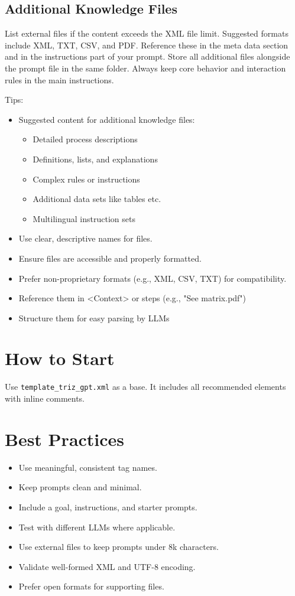 \documentclass[a4paper,11pt]{refart}
\begin{document}
\subsection{Additional Knowledge Files}
List external files if the content exceeds the XML file limit. Suggested formats include XML, TXT, CSV, and PDF. Reference these in the meta data section and in the instructions part of your prompt. Store all additional files alongside the prompt file in the same folder. Always keep core behavior and interaction rules in the main instructions.

Tips:
\begin{itemize}
  \item Suggested content for additional knowledge files:
  \begin{itemize}
    \item Detailed process descriptions
    \item Definitions, lists, and explanations
    \item Complex rules or instructions
    \item Additional data sets like tables etc.
    \item Multilingual instruction sets  
  \end{itemize}
  \item Use clear, descriptive names for files.
  \item Ensure files are accessible and properly formatted.
  \item Prefer non-proprietary formats (e.g., XML, CSV, TXT) for compatibility.
  \item Reference them in <Context> or steps (e.g., "See matrix.pdf")
  \item Structure them for easy parsing by LLMs
\end{itemize}
  
\section{How to Start}
Use \lstinline!template_triz_gpt.xml! as a base. It includes all recommended elements with inline comments.

\section{Best Practices}
\begin{itemize}
  \item Use meaningful, consistent tag names.
  \item Keep prompts clean and minimal.
  \item Include a goal, instructions, and starter prompts.
  \item Test with different LLMs where applicable.
  \item Use external files to keep prompts under 8k characters.
  \item Validate well-formed XML and UTF-8 encoding.
  \item Prefer open formats for supporting files.
\end{itemize}
\end{document}
